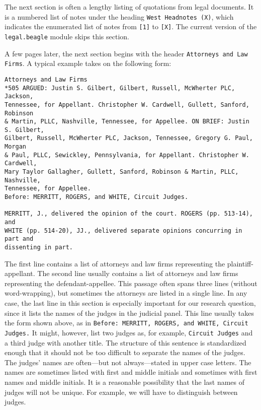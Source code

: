 \documentclass[11pt]{paper}
\begin{document}
The next section is often a lengthy listing of quotations from legal documents. 
It is a numbered list of notes under the heading \texttt{West Headnotes (X)}, 
which indicates the enumerated list of notes from \texttt{[1]} to \texttt{[X]}. 
The current version of the \texttt{legal.beagle} module skips this section. 

A few pages later, the next section begins with the header 
\texttt{Attorneys and Law Firms}. 
A typical example takes on the following form:
%
\begin{verbatim}
Attorneys and Law Firms
*505 ARGUED: Justin S. Gilbert, Gilbert, Russell, McWherter PLC, Jackson, 
Tennessee, for Appellant. Christopher W. Cardwell, Gullett, Sanford, Robinson 
& Martin, PLLC, Nashville, Tennessee, for Appellee. ON BRIEF: Justin S. Gilbert, 
Gilbert, Russell, McWherter PLC, Jackson, Tennessee, Gregory G. Paul, Morgan 
& Paul, PLLC, Sewickley, Pennsylvania, for Appellant. Christopher W. Cardwell, 
Mary Taylor Gallagher, Gullett, Sanford, Robinson & Martin, PLLC, Nashville, 
Tennessee, for Appellee.
Before: MERRITT, ROGERS, and WHITE, Circuit Judges.

MERRITT, J., delivered the opinion of the court. ROGERS (pp. 513-14), and 
WHITE (pp. 514-20), JJ., delivered separate opinions concurring in part and 
dissenting in part.

\end{verbatim}
%

The first line contains a list of attorneys and law firms representing the 
plaintiff-appellant. 
The second line usually contains a list of attorneys and law firms representing
the defendant-appellee. 
This passage often spans three lines (without word-wrapping), but sometimes 
the attorneys are listed in a single line.
In any case, the last line in this section is especially important for our 
research question, since it lists the names of the judges in the judicial 
panel. 
This line usually takes the form shown above, as in 
\texttt{Before: MERRITT, ROGERS, and WHITE, Circuit Judges.}
It might, however, list two judges as, for example, \texttt{Circuit Judges}
and a third judge with another title. 
The structure of this sentence is standardized enough that it should not be 
too difficult to separate the names of the judges. 
The judges' names are often---but not always---stated in upper case letters. 
The names are sometimes listed with first and middle initials
and sometimes with first names and middle initials. 
It is a reasonable possibility that the last names of judges will not be 
unique. 
For example, we will have to distinguish between judges.
\end{document}
